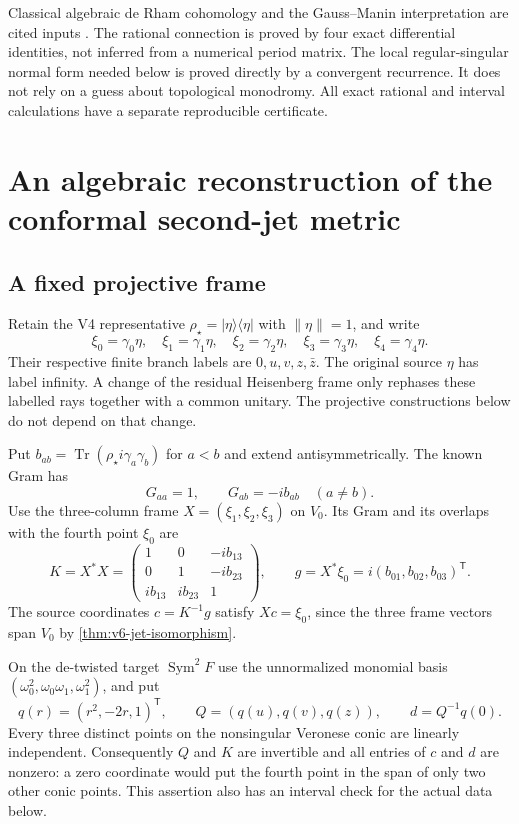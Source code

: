 \documentclass[11pt]{article}
\theoremstyle{definition}
\theoremstyle{remark}
\newcommand{\Tr}{\operatorname{Tr}}
\newcommand{\norm}[1]{\lVert#1\rVert}
\newcommand{\ketbra}[1]{|#1\rangle\langle#1|}
\begin{document}
Classical algebraic de Rham cohomology and the Gauss--Manin interpretation are
cited inputs \cite{KatzOda,KTdeRham}. The rational connection is proved by four
exact differential identities, not inferred from a numerical period matrix.
The local regular-singular normal form needed below is proved directly by a
convergent recurrence. It does not rely on a guess about topological
monodromy. All exact rational and interval calculations have a separate
reproducible certificate.

\section{An algebraic reconstruction of the conformal second-jet metric}
\label{sec:v7-metric}

\subsection{A fixed projective frame}
Retain the V4 representative $\rho_\star=\ketbra{\eta}$ with
$\norm\eta=1$, and write
\[
 \xi_0=\gamma_0\eta,\quad \xi_1=\gamma_1\eta,\quad
 \xi_2=\gamma_2\eta,\quad \xi_3=\gamma_3\eta,\quad
 \xi_4=\gamma_4\eta.
\]
Their respective finite branch labels are $0,u,v,z,\bar z$. The original
source $\eta$ has label infinity. A change of the residual Heisenberg frame
only rephases these labelled rays together with a common unitary. The
projective constructions below do not depend on that change.

Put $b_{ab}=\Tr(\rho_\star i\gamma_a\gamma_b)$ for $a<b$ and extend
antisymmetrically. The known Gram has
\[
 G_{aa}=1,\qquad G_{ab}=-i b_{ab}\quad(a\ne b).
\]
Use the three-column frame $X=(\xi_1,\xi_2,\xi_3)$ on $V_0$. Its Gram
and its overlaps with the fourth point $\xi_0$ are
\begin{equation}
 K=X^*X=
 \begin{pmatrix}
 1&0&-ib_{13}\\
 0&1&-ib_{23}\\
 ib_{13}&ib_{23}&1
 \end{pmatrix},\qquad
 g=X^*\xi_0=i(b_{01},b_{02},b_{03})^{\mathsf T}.
 \label{eq:v7-Kg}
\end{equation}
The source coordinates $c=K^{-1}g$ satisfy $Xc=\xi_0$, since the three
frame vectors span $V_0$ by \cref{thm:v6-jet-isomorphism}.

On the de-twisted target $\operatorname{Sym}^2F$ use the unnormalized monomial
basis $(\omega_0^2,\omega_0\omega_1,\omega_1^2)$, and put
\begin{equation}
 q(r)=(r^2,-2r,1)^{\mathsf T},\qquad
 Q=(q(u),q(v),q(z)),\qquad d=Q^{-1}q(0).
 \label{eq:v7-conic-frame}
\end{equation}
Every three distinct points on the nonsingular Veronese conic are linearly
independent. Consequently $Q$ and $K$ are invertible and all entries of $c$
and $d$ are nonzero: a zero coordinate would put the fourth point in the span
of only two other conic points. This assertion also has an interval check for
the actual data below.
\end{document}

